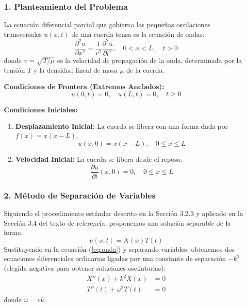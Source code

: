 \documentclass[a4paper]{article}
\begin{document}
\subsubsection{1. Planteamiento del Problema}

La ecuación diferencial parcial que gobierna las pequeñas oscilaciones transversales $u(x,t)$ de una cuerda tensa es la ecuación de ondas:
\begin{equation}
\frac{\partial^2 u}{\partial x^2} = \frac{1}{v^2} \frac{\partial^2 u}{\partial t^2}, \quad 0 < x < L, \quad t > 0
\label{eq:onda}
\end{equation}
donde $v = \sqrt{T/\mu}$ es la velocidad de propagación de la onda, determinada por la tensión $T$ y la densidad lineal de masa $\mu$ de la cuerda.

\textbf{Condiciones de Frontera (Extremos Anclados):}
\begin{equation}
u(0, t) = 0, \quad u(L, t) = 0, \quad t \geq 0
\label{eq:bc}
\end{equation}

\textbf{Condiciones Iniciales:}
\begin{enumerate}
    \item \textbf{Desplazamiento Inicial:} La cuerda se libera con una forma dada por $f(x) = x(x-L)$.
    \begin{equation}
    u(x, 0) = x(x - L), \quad 0 \leq x \leq L
    \label{eq:ic_u}
    \end{equation}
    \item \textbf{Velocidad Inicial:} La cuerda se libera desde el reposo.
    \begin{equation}
    \frac{\partial u}{\partial t}(x, 0) = 0, \quad 0 \leq x \leq L
    \label{eq:ic_v}
    \end{equation}
\end{enumerate}

\subsubsection{2. Método de Separación de Variables}

Siguiendo el procedimiento estándar descrito en la Sección 3.2.3 y aplicado en la Sección 3.4 del texto de referencia, proponemos una solución separable de la forma:
\begin{equation}
u(x, t) = X(x)T(t)
\end{equation}
Sustituyendo en la ecuación (\ref{eq:onda}) y separando variables, obtenemos dos ecuaciones diferenciales ordinarias ligadas por una constante de separación $-k^2$ (elegida negativa para obtener soluciones oscilatorias):
\begin{align}
X''(x) + k^2 X(x) &= 0 \label{eq:X_ode} \\
T''(t) + \omega^2 T(t) &= 0 \label{eq:T_ode}
\end{align}
donde $\omega = vk$.
\end{document}
